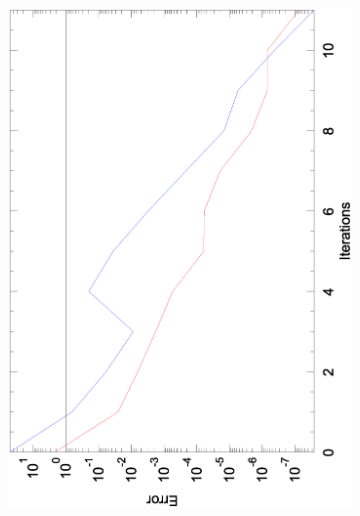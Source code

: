 \documentclass[12pt,parskip=full]{article}
\numberwithin{subsection}{section}
\begin{document}
\begin{figure}[h]
\begin{subfigure}[h]{0.45\textwidth}
				\includegraphics[width=\textwidth, angle=270]{Convergance_10_20.eps}
				\vspace{-13ex}
			\end{subfigure}
			\begin{subfigure}[h]{0.45\textwidth}

\end{subfigure}
\end{figure}
\end{document}
